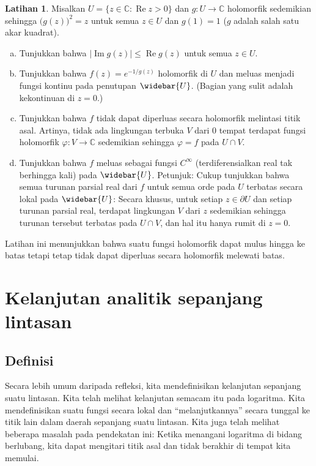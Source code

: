 \documentclass[12pt,openany]{book}
\renewcommand{\Re}{\operatorname{Re}}
\renewcommand{\Im}{\operatorname{Im}}
\newcommand{\sabs}[1]{\lvert {#1} \rvert}
\newcommand{\C}{{\mathbb{C}}}
\newcommand{\myquote}[1]{``#1''}
\theoremstyle{plain}
\theoremstyle{remark}
\theoremstyle{definition}
\newenvironment{exbox}{%
    \def\FrameCommand{\vrule width 1pt \relax\hspace{10pt}}%
    \MakeFramed{\advance\hsize-\width\FrameRestore}%
}{%
    \endMakeFramed
}
\newenvironment{exparts}{%
    \leavevmode\begin{enumerate}[a),noitemsep,topsep=0pt,parsep=0pt,partopsep=0pt]
}{%
    \end{enumerate}
}
\theoremstyle{exercise}
\newtheorem{exercise}{Latihan}[section]
\theoremstyle{example}
\begin{document}
\begin{exbox}
\begin{exercise}
Misalkan $U = \{ z \in \C : \Re z > 0 \}$ dan
$g \colon U  \to \C$ holomorfik
sedemikian sehingga ${\bigl(g(z)\bigr)}^2 = z$ untuk
semua $z \in U$ dan $g(1) = 1$ ($g$ adalah salah satu akar kuadrat).
\begin{exparts}
\item
Tunjukkan bahwa
$\sabs{\Im g(z)} \leq \Re g(z)$
untuk semua $z \in U$.
\item
Tunjukkan bahwa $f(z) = e^{-1/g(z)}$ holomorfik di $U$
dan meluas menjadi fungsi kontinu pada penutupan
$\widebar{U}$.  (Bagian yang sulit adalah kekontinuan di $z=0$.)
\item
Tunjukkan bahwa $f$ tidak dapat diperluas secara holomorfik melintasi
titik asal.  Artinya, tidak ada lingkungan terbuka $V$ dari $0$ tempat
terdapat fungsi holomorfik
$\varphi \colon V \to \C$ sedemikian sehingga $\varphi = f$ pada $U \cap V$.
\item
Tunjukkan bahwa $f$ meluas sebagai fungsi
$C^\infty$ (terdiferensialkan real tak berhingga kali) pada $\widebar{U}$.
Petunjuk: Cukup tunjukkan bahwa
semua turunan parsial real dari $f$ untuk semua orde pada $U$
terbatas secara lokal pada $\widebar{U}$: Secara khusus, untuk setiap $z \in \partial U$ 
dan setiap turunan parsial real,
terdapat lingkungan $V$ dari $z$ sedemikian sehingga turunan tersebut
terbatas pada $U \cap V$, dan hal itu hanya rumit di $z=0$.
\end{exparts}
Latihan ini menunjukkan bahwa suatu
fungsi holomorfik dapat mulus hingga ke
batas tetapi tetap tidak dapat diperluas secara holomorfik melewati batas.
\end{exercise}
\end{exbox}


\section{Kelanjutan analitik sepanjang lintasan}
\label{sec:analcontelts}

\subsection{Definisi}

Secara lebih umum daripada refleksi, kita mendefinisikan kelanjutan sepanjang suatu lintasan.
Kita telah melihat kelanjutan semacam itu pada
logaritma.  Kita mendefinisikan suatu fungsi secara lokal dan \myquote{melanjutkannya}
secara tunggal ke titik lain dalam daerah sepanjang suatu lintasan.
Kita juga telah melihat beberapa masalah pada pendekatan ini:
Ketika menangani logaritma di bidang berlubang, kita dapat mengitari titik asal
dan tidak berakhir di tempat kita memulai.
\end{document}

